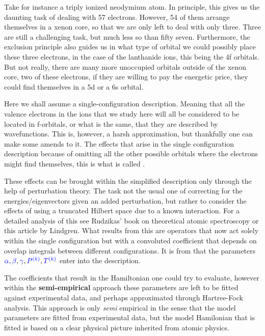 \documentclass{article}
\begin{document}
Take for instance a triply ionized neodymium atom. In principle, this gives us the daunting task of dealing with 57 electrons. However, 54 of them arrange themselves in a xenon core, so that we are only left to deal with only three. Three are still a challenging task, but much less so than fifty seven. Furthermore, the exclusion principle also guides us in what type of orbital we could possibly place these three electrons, in the case of the lanthanide ions, this being the 4f orbitals. But not really, there are many more unoccupied orbitals outside of the xenon core, two of these electrons, if they are willing to pay the energetic price, they could find themselves in a 5d or a 6s orbital.  

Here we shall assume a single-configuration description. Meaning that all the valence electrons in the ions that we study here will all be considered to be located in f-orbitals, or what is the same, that they are described by \fn wavefunctions. This is, however, a harsh approximation, but thankfully one can make some amends to it. The effects that arise in the single configuration description because of omitting all the other possible orbitals where the electrons might find themselves, this is what is called \confint.  

These effects can be brought within the simplified description only through the help of perturbation theory. The task not the usual one of correcting for the energies/eigenvectors given an added perturbation, but rather to consider the effects of using a truncated Hilbert space due to a known interaction. For a detailed analysis of this see Rudzikas' \cite{rudzikas_theoretical_2007} book on theoretical atomic spectroscopy or this article \cite{lindgren_rayleigh-schrodinger_1974} by Lindgren. What results from this are operators that now act solely within the single configuration but with a convoluted coefficient that depends on overlap integrals between different configurations. It is from \confint that the parameters $\textcolor{blue}{{\alpha}}, \textcolor{blue}{{\beta}}, \textcolor{blue}{{\gamma}}, \textcolor{blue}{P^{(k)}}, \textcolor{blue}{T^{(k)}}$ enter into the description.

The coefficients that result in the Hamiltonian one could try to evaluate, however within the \textbf{semi-empirical} approach these parameters are left to be fitted against experimental data, and perhaps approximated through Hartree-Fock analysis. This approach is only \textit{semi} empirical in the sense that the model parameters are fitted from experimental data, but the model Hamilonian that is fitted is based on a clear physical picture inherited from atomic physics.
\end{document}
